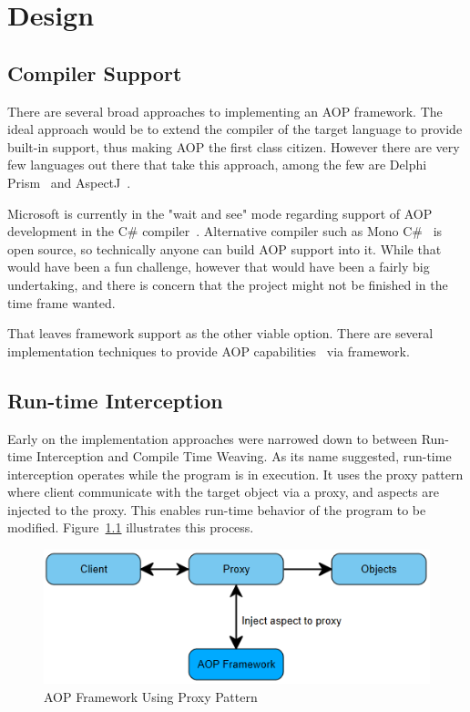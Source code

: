 \chapter{Design}

\section{Compiler Support}

There are several broad approaches to implementing an AOP framework. The ideal approach would be to extend the compiler of the target language to provide built-in support, thus making AOP the first class citizen. However there are very few languages out there that take this approach, among the few are Delphi Prism~\cite{delphi_prism2010} and AspectJ~\cite{aspectj_faq, aspectj_text}. 

Microsoft is currently in the "wait and see" mode regarding support of AOP development in the C\# compiler~\cite{hejlsberg}. Alternative compiler such as Mono C\#~\cite{monocsharp} is open source, so technically anyone can build AOP support into it. While that would have been a fun challenge, however that would have been a fairly big undertaking, and there is concern that the project might not be finished in the time frame wanted.

That leaves framework support as the other viable option. There are several implementation techniques to provide AOP capabilities~\cite{aopcs, postsharp, aspectcs} via framework.

\section{Run-time Interception}

Early on the implementation approaches were narrowed down to between Run-time Interception and Compile Time Weaving. As its name suggested, run-time interception operates while the program is in execution. It uses the proxy pattern where client communicate with the target object via a proxy, and aspects are injected to the proxy. This enables run-time behavior of the program to be modified. Figure~\ref{proxy_model} illustrates this process.

\begin{figure}[H]
  \includegraphics[scale=1.0]{Proxy.PNG}
  \centering
  \caption{AOP Framework Using Proxy Pattern\label{proxy_model}}
\end{figure}

